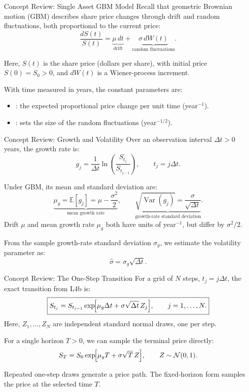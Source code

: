 \documentclass[aspectratio=169,11pt]{beamer}
\newcommand{\E}{\mathbb{E}}
\newcommand{\Var}{\operatorname{Var}}
\begin{document}
\begin{frame}{Concept Review: Single Asset GBM Model}
  Recall that geometric Brownian motion (GBM) describes share price changes
  through drift and random fluctuations, both proportional to the current price:
  \[
    \frac{dS(t)}{S(t)}
    =\underbrace{\mu\,dt}_{\text{drift}}
    +\underbrace{\sigma\,dW(t)}_{\text{random fluctuations}}.
  \]

  Here, $S(t)$ is the share price (dollars per share), with initial price
  $S(0)=S_0>0$, and $dW(t)$ is a Wiener-process increment.

  \vspace{0.6em}
  With time measured in years, the constant parameters are:
  \begin{itemize}\setlength{\itemsep}{0.65em}
    \item {}: the expected proportional price
      change per unit time (year$^{-1}$).
    \item {}: sets the size of the random
      fluctuations (year$^{-1/2}$).
  \end{itemize}
\end{frame}

\begin{frame}{Concept Review: Growth and Volatility}
  Over an observation interval $\Delta t>0$ years, the growth rate is:
  \[
    g_j=\frac{1}{\Delta t}\ln\!\left(\frac{S_{t_j}}{S_{t_{j-1}}}\right),
    \qquad t_j=j\Delta t.
  \]

  Under GBM, its mean and standard deviation are:
  \[
    \underbrace{\mu_g=\E[g_j]=\mu-\frac{\sigma^2}{2}}_{\text{mean growth rate}},
    \qquad
    \underbrace{\sqrt{\Var(g_j)}=\frac{\sigma}{\sqrt{\Delta t}}}_{\text{growth-rate standard deviation}}.
  \]
  Drift $\mu$ and mean growth rate $\mu_g$ both have units of year$^{-1}$,
  but differ by $\sigma^2/2$.

  \vspace{0.5em}
  From the sample growth-rate standard deviation $\sigma_g$, we estimate
  the volatility parameter as:
  \[
    \hat\sigma=\sigma_g\sqrt{\Delta t}.
  \]
\end{frame}

\begin{frame}{Concept Review: The One-Step Transition}
  For a grid of $N$ steps, $t_j=j\Delta t$, the exact transition from L4b is:
  \[
    \boxed{S_{t_j}=S_{t_{j-1}}\exp\!\Bigl[\mu_g\Delta t+
      \sigma\sqrt{\Delta t}\,Z_j\Bigr],\qquad j=1,\ldots,N.}
  \]
  Here, $Z_1,\ldots,Z_N$ are independent standard normal draws, one per step.

  \vspace{0.7em}
  For a single horizon $T>0$, we can sample the terminal price directly:
  \[
    S_T=S_0\exp\!\Bigl[\mu_gT+\sigma\sqrt{T}\,Z\Bigr],
    \qquad Z\sim\mathcal N(0,1).
  \]

  \vspace{0.5em}
  Repeated one-step draws generate a price path. The fixed-horizon form
  samples the price at the selected time $T$.
\end{frame}
\end{document}
